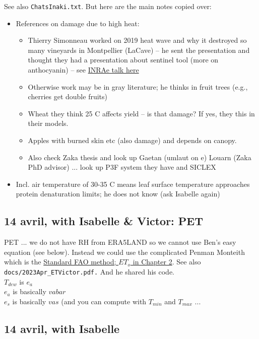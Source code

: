\documentclass[11pt,letter]{article}
\begin{document}
See also \verb|ChatsInaki.txt|. But here are the main notes copied over:
\begin{itemize}
\item References on damage due to high heat: 
\begin{itemize}
\item Thierry Simonneau worked on 2019 heat wave and why it destroyed so many vineyards in Montpellier (LaCave) -- he sent the presentation and thought they had a presentation about sentinel tool (more on anthocyanin) -- see \href{https://www6.inrae.fr/laccave/content/download/3466/35052/version/2/file/Canicule_Simonneau_25112021.pdf}{INRAe talk here}
\item Otherwise work may be in gray literature; he thinks in fruit trees (e.g., cherries get double fruits)
\item Wheat they think 25 C affects yield -- is that damage? If yes, they this in their models. 
\item  Apples with burned skin etc (also damage) and depends on canopy. 
\item Also check Zaka thesis and look up Gaetan (umlaut on e) Louarn (Zaka PhD advisor) ... look up P3F system they have and SICLEX
\end{itemize}
\item Incl. air temperature of 30-35 C means leaf surface temperature approaches protein denaturation limits; he does not know (ask Isabelle again)
\end{itemize}


\subsection{14 avril, with Isabelle \& Victor: PET}

PET ... we do not have RH from ERA5LAND so we cannot use Ben's easy equation (see below). Instead we could use the complicated Penman Monteith which is the \href{https://www.fao.org/3/x0490e/x0490e06.htm#TopOfPage}{Standard FAO method; $ET_o$ in Chapter 2}. See also \verb|docs/2023Apr_ETVictor.pdf.| And he shared his code.\\

$T_{dew}$ is $e_a$\\
$e_a$ is basically $vabar$\\
$e_s$ is basically $vas$ (and you can compute with $T_{min}$ and $T_{max}$ ...\\

\subsection{14 avril, with Isabelle}
\end{document}
